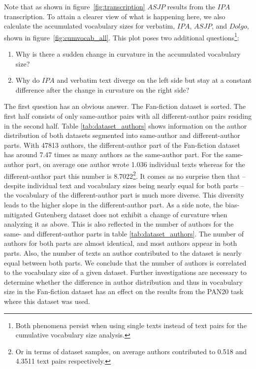 Note that as shown in figure~\ref{fig:transcription} $ASJP$ results from the $IPA$ transcription.
To attain a clearer view of what is happening here, we also calculate the accumulated vocabulary sizes for verbatim, $IPA$, $ASJP$, and $Dolgo$, shown in figure~\ref{fig:cumvocab_all}.
This plot poses two additional questions\footnote{Both phenomena persist when using single texts instead of text pairs for the cumulative vocabulary size analysis.}:
\begin{enumerate}
    \item Why is there a sudden change in curvature in the accumulated vocabulary size?
    \item Why do $IPA$ and verbatim text diverge on the left side but stay at a constant difference after the change in curvature on the right side?
\end{enumerate}
The first question has an obvious answer.
The Fan-fiction dataset is sorted.
The first half consists of only same-author pairs with all different-author pairs residing in the second half.
Table \ref{tab:dataset_authors} shows information on the author distribution of both datasets segmented into same-author and different-author parts.
With 47813 authors, the different-author part of the Fan-fiction dataset has around 7.47 times as many authors as the same-author part.
For the same-author part, on average one author wrote 1.036 individual texts whereas for the different-author part this number is 8.7022\footnote{Or in terms of dataset samples, on average authors contributed to 0.518 and 4.3511 text pairs respectively.}.
It comes as no surprise then that -- despite individual text and vocabulary sizes being nearly equal for both parts -- the vocabulary of the different-author part is much more diverse.
This diversity leads to the higher slope in the different-author part.
As a side note, the bias-mitigated Gutenberg dataset does not exhibit a change of curvature when analyzing it as above.
This is also reflected in the number of authors for the same- and different-author parts in table \ref{tab:dataset_authors}.
The number of authors for both parts are almost identical, and most authors appear in both parts.
Also, the number of texts an author contributed to the dataset is nearly equal between both parts.
We conclude that the number of authors is correlated to the vocabulary size of a given dataset.
Further investigations are necessary to determine whether the difference in author distribution and thus in vocabulary size in the Fan-fiction dataset has an effect on the results from the PAN20 task where this dataset was used.\\
